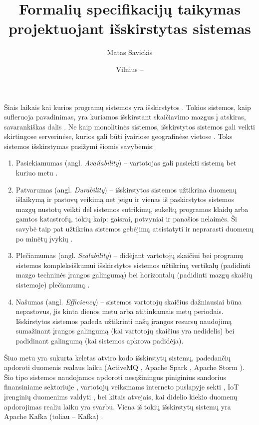 \documentclass{VUMIFPSmagistrinis}
\title{Formalių specifikacijų taikymas projektuojant išskirstytas sistemas}
\author{Matas Savickis}
\date{Vilnius – \the\year}
\begin{document}

\maketitle
\setcounter{page}{2}
\tableofcontents




		Šiais laikais kai kurios programų sistemos yra išskirstytos \cite{mcr}. 
		Tokios sistemos, kaip sufleruoja pavadinimas, yra kuriamos išskirstant skaičiavimo mazgus į atskiras, savarankiškas dalis \cite{coulouris2005distributed}.
		Ne kaip monolitinės sistemos, išskirstytos sistemos gali veikti skirtingose serverinėse, kurios gali būti įvairiose geografinėse vietose \cite{shirriff2006method}.
		Toks sistemos išskirstymas pasižymi šiomis savybėmis:
		\begin{enumerate}
			\item{Pasiekiamumas (angl. {\it Availability}) -- vartotojas gali pasiekti sistemą bet kuriuo metu \cite{180327}.}
			\item{Patvarumas (angl. {\it Durability}) -- išskirstytos sistemos užtikrina duomenų išlaikymą ir pastovų veikimą net jeigu ir vienas iš paskirstytos sistemos mazgų nustotų veikti dėl sistemos sutrikimų, sukeltų programos klaidų arba gamtos katastrofų, tokių kaip: gaisrai, potvyniai ir panašios nelaimės. Ši savybė taip pat užtikrina sistemos gebėjimą atsistatyti ir neprarasti duomenų po minėtų įvykių \cite{5470366}.}
			\item{Plečiamumas (angl. {\it Scalability}) -- didėjant vartotojų skaičiui bei programų sistemos kompleksiškumui išskirstytos sistemos užtikriną vertikalų (padidinti mazgo techninės įrangos galingumą) bei horizontalų (padidinti mazgų skaičių sistemoje) plečiamumą \cite{862209}.}
			\item{Našumas (angl. {\it Efficiency}) -- sistemos vartotojų skaičius dažniausiai būna nepastovus, jis kinta dienos metu arba atitinkamais metų periodais. Išskirstytos sistemos padeda užtikrinti našų įrangos resursų naudojimą sumažinant įrangos galingumą (kai vartotojų skaičius yra nedidelis) bei padidinant galingumą (kai sistemos apkrova padidėja).}
		\end{enumerate}
		Šiuo metu yra sukurta keletas atviro kodo išskirstytų sistemų, padedančių apdoroti duomenis realaus laiku (ActiveMQ \cite{snyder2011activemq}, Apache Spark \cite{spark2018apache}, Apache Storm \cite{iqbal2015big}).	
		Šio tipo sistemos naudojamos apdoroti nesąžiningus piniginius sandorius finansiniame sektoriuje \cite{fraud}, vartotojų veiksmams interneto puslapyje sekti \cite{tracking}, IoT įrenginių duomenims valdyti \cite{iot}, bei kitais atvejais, kai didelio kiekio duomenų apdorojimas realiu laiku yra svarbu. 
		Viena iš tokių išskirstytų sistemų yra Apache Kafka (toliau -- Kafka) \cite{kfk}.
\end{document}
